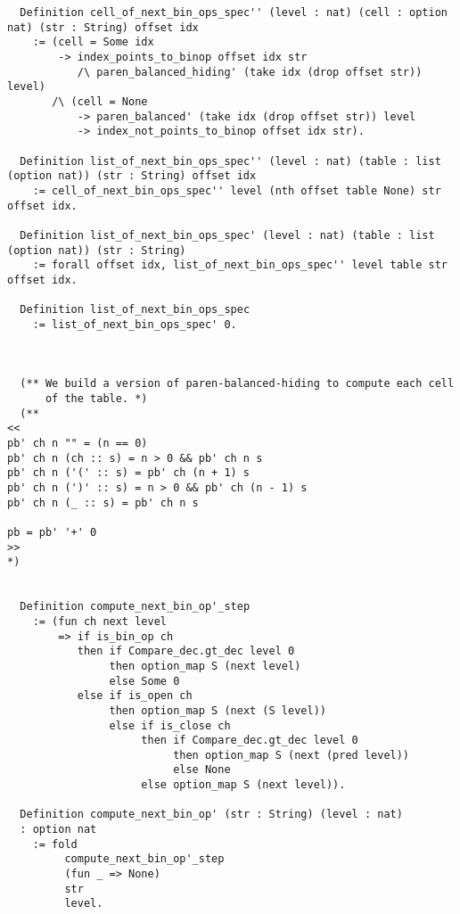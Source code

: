 \begin{verbatim}
  Definition cell_of_next_bin_ops_spec'' (level : nat) (cell : option nat) (str : String) offset idx
    := (cell = Some idx
        -> index_points_to_binop offset idx str
           /\ paren_balanced_hiding' (take idx (drop offset str)) level)
       /\ (cell = None
           -> paren_balanced' (take idx (drop offset str)) level
           -> index_not_points_to_binop offset idx str).

  Definition list_of_next_bin_ops_spec'' (level : nat) (table : list (option nat)) (str : String) offset idx
    := cell_of_next_bin_ops_spec'' level (nth offset table None) str offset idx.

  Definition list_of_next_bin_ops_spec' (level : nat) (table : list (option nat)) (str : String)
    := forall offset idx, list_of_next_bin_ops_spec'' level table str offset idx.

  Definition list_of_next_bin_ops_spec
    := list_of_next_bin_ops_spec' 0.



  (** We build a version of paren-balanced-hiding to compute each cell
      of the table. *)
  (**
<<
pb' ch n "" = (n == 0)
pb' ch n (ch :: s) = n > 0 && pb' ch n s
pb' ch n ('(' :: s) = pb' ch (n + 1) s
pb' ch n (')' :: s) = n > 0 && pb' ch (n - 1) s
pb' ch n (_ :: s) = pb' ch n s

pb = pb' '+' 0
>>
*)


  Definition compute_next_bin_op'_step
    := (fun ch next level
        => if is_bin_op ch
           then if Compare_dec.gt_dec level 0
                then option_map S (next level)
                else Some 0
           else if is_open ch
                then option_map S (next (S level))
                else if is_close ch
                     then if Compare_dec.gt_dec level 0
                          then option_map S (next (pred level))
                          else None
                     else option_map S (next level)).

  Definition compute_next_bin_op' (str : String) (level : nat)
  : option nat
    := fold
         compute_next_bin_op'_step
         (fun _ => None)
         str
         level.

\end{verbatim}